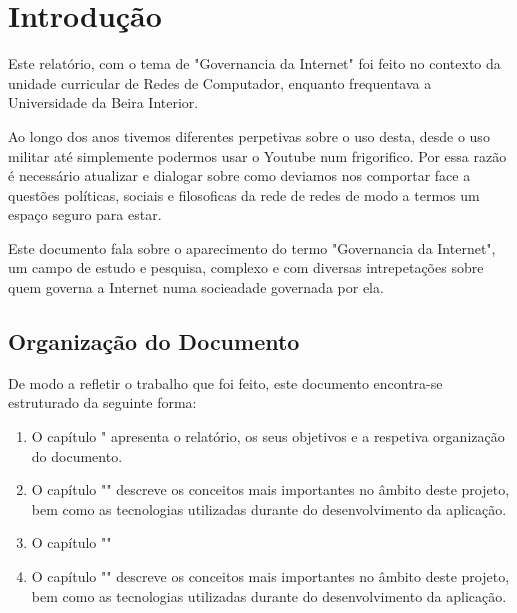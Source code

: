 \section{Introdução}
\label{sec:intro}
Este relatório, com o tema de "Governancia da Internet" foi feito no contexto da unidade curricular de Redes de Computador, enquanto frequentava a Universidade da Beira Interior.

Ao longo dos anos tivemos diferentes perpetivas sobre o uso desta,
desde o uso militar até simplemente podermos usar o Youtube num frigorifico. Por essa razão
é necessário atualizar e dialogar sobre como deviamos nos comportar face a questões políticas, sociais e filosoficas da rede de redes
de modo a termos um espaço seguro para estar.

Este documento fala sobre o aparecimento do termo "Governancia da Internet", um campo de estudo e pesquisa,
complexo e com diversas intrepetações sobre quem governa a Internet numa socieadade governada por ela.

\subsection{Organização do Documento}

De modo a refletir o trabalho que foi feito, este documento encontra-se estruturado da seguinte forma:
\begin{enumerate}
  \item O capítulo " apresenta o relatório, os seus objetivos e a respetiva organização do documento.
  \item O capítulo "" descreve os conceitos mais importantes no âmbito deste projeto, bem como as tecnologias utilizadas durante do desenvolvimento da aplicação.
  \item O capítulo ""
  \item O capítulo "" descreve os conceitos mais importantes no âmbito deste projeto, bem como as tecnologias utilizadas durante do desenvolvimento da aplicação.
\end{enumerate}
